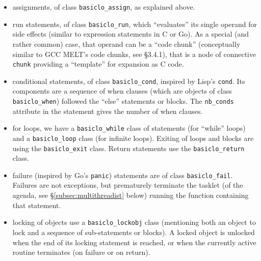 \begin{itemize}
\item assignments, of class \texttt{basiclo\_assign}, as explained above.
  
  \item run statements, of class \texttt{basiclo\_run},  which ``evaluates'' its single operand
    for side effects (similar to expression statements in C or Go). As
    a special (and rather common) case, that operand can be a ``code
    chunk''  (conceptually similar to GCC MELT's
    code chunks, see \cite{Starynkevitch-DSL2011} §3.4.1), that is a
    node of connective \texttt{chunk} providing a ``template'' for
    expansion as C code.

  \item conditional statements, of class \texttt{basiclo\_cond},
      inspired by Lisp's \texttt{cond}. Its components are a sequence
      of when clauses (which are objects of class
      \texttt{basiclo\_when}) followed the ``else'' statements or
      blocks. The \texttt{nb\_conds} attribute in the statement gives
      the number of when clauses.

    \item for loops, we have a \texttt{basiclo\_while} class of
      statements (for ``while'' loops) and a \texttt{basiclo\_loop}
      class (for infinite loops). Exiting of loops and blocks are
      using the \texttt{basiclo\_exit} class. Return statements use
      the \texttt{basiclo\_return} class.

      \item failure (inspired by Go's \texttt{panic}) statements are
        of class \texttt{basiclo\_fail}. Failures are not exceptions,
        but prematurely terminate the tasklet (of the agenda, see
        §\ref{subsec:multithreadist} below) running the function
        containing that statement.

      \item locking of objects use a \texttt{basiclo\_lockobj} class
        (mentioning both an object to lock and a sequence of
        sub-statements or blocks). A locked object is unlocked when
        the end of its locking statement is reached, or when the
        currently active routine terminates (on failure or on return).


\end{itemize}
